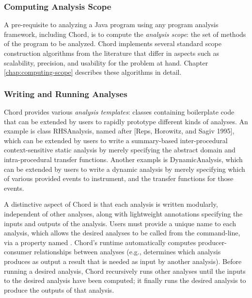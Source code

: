 \subsubsection*{Computing Analysis Scope}

A pre-requisite to analyzing a Java program using any program analysis framework, including Chord, is
to compute the {\it analysis scope}: the set of methods of the program to be analyzed.  Chord implements
several standard scope construction algorithms from the literature that differ in aspects such as
scalability, precision, and usability for the problem at hand.  Chapter \ref{chap:computing-scope}
describes these algorithms in detail.

\subsubsection*{Writing and Running Analyses}

Chord provides various {\it analysis templates}: classes containing boilerplate code that can be
extended by users to rapidly prototype different kinds of analyses.  An example is class RHSAnalysis,
named after [Reps, Horowitz, and Sagiv 1995], which can be extended by users to write a summary-based inter-procedural
context-sensitive static analysis by merely specifying the abstract domain and intra-procedural transfer functions.
Another exampls is DynamicAnalysis, which can be extended by
users to write a dynamic analysis by merely specifying which of various provided events to instrument, and
the transfer functions for those events.

A distinctive aspect of Chord is that each analysis is written modularly, independent of other analyses, along with lightweight
annotations specifying the inputs and outputs of the analysis.
Users must provide a unique name to each analysis, which allows the desired analyses to be called from the
command-line, via a property named .
Chord's runtime automatically computes
producer-consumer relationships between analyses (e.g., determines which analysis produces as output a
result that is needed as input by another analysis).  Before running a desired analysis,
Chord recursively runs other analyses until the inputs to the desired analysis have been computed; it
finally runs the desired analysis to produce the outputs of that analysis.

